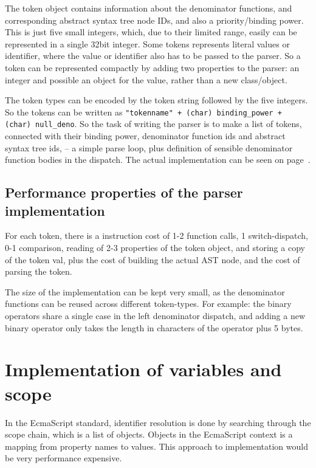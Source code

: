 \documentclass[11pt]{report}
\begin{document}
The token object contains information about the denominator functions, and corresponding abstract syntax tree node IDs, and also a priority/binding power.
This is just five small integers, which, due to their limited range, easily can be represented in a single 32bit integer. 
Some tokens represents literal values or identifier, where the value or identifier also has to be passed to the parser.
So a token can be represented compactly by adding two properties to the parser: an integer and possible an object for the value, rather than a new class/object.

The token types can be encoded by the token string followed by the five integers.
So the tokens can be written as {\tt "tokenname" + (char) binding\_power + 
(char) null\_deno}. 
So the task of writing the parser is to make a list of tokens, connected with their binding power, denominator function ids and abstract syntax tree ids, -- a simple parse loop, plus definition of sensible denominator function bodies in the dispatch.
The actual implementation can be seen on page~\pageref{code-lightscript-parser}.


\subsection{Performance properties of the parser implementation}

For each token, there is a instruction cost of 1-2 function calls, 1 switch-dispatch, 0-1 comparison, reading of 2-3 properties of the token object, and storing a copy of the token val, plus the cost of building the actual AST node, and the cost of parsing the token.

The size of the implementation can be kept very small, as the denominator functions can be reused across different token-types. For example: the binary operators share a single case in the left denominator dispatch, and adding a new binary operator only takes the length in characters of the operator plus 5 bytes. 

\section{Implementation of variables and scope}
In the EcmaScript standard, identifier resolution is done by searching through the scope chain, which is a list of objects. Objects in the EcmaScript context is a mapping from property names to values. This approach to implementation would be very performance expensive.
\end{document}
